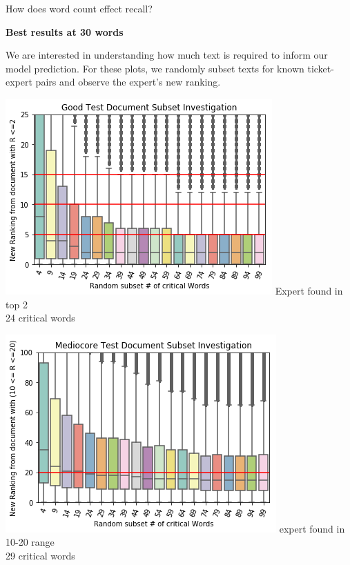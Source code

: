 \documentclass[10pt]{beamer}
\begin{document}
\begin{frame}{How does word count effect recall?}

  {\bf Best results at 30 words}

  We are interested in understanding how much text is required to inform
  our model prediction. For these plots, we randomly subset texts for
  known ticket-expert pairs and observe the expert's new ranking.

  \begin{multicols}{2}
    \includegraphics[width=\columnwidth]{low-ranked-downsample.png}
    Expert found in top 2\\
    24 critical words


    \includegraphics[width=\columnwidth]{mid-ranked-downsample.png}
    expert found in 10-20 range\\
    29 critical words
  \end{multicols}
\end{frame}
\end{document}
